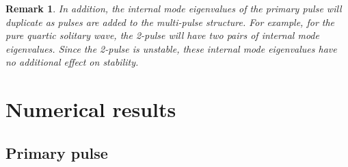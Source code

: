 \documentclass[12pt]{elsarticle}
\newtheorem{remark}{Remark}
\begin{document}
\begin{remark}In addition, the internal mode eigenvalues of the primary pulse will duplicate as pulses are added to the multi-pulse structure. For example, for the pure quartic solitary wave, the 2-pulse will have two pairs of internal mode eigenvalues. Since the 2-pulse is unstable, these internal mode eigenvalues have no additional effect on stability.
\end{remark}

\section{Numerical results}

\subsection{Primary pulse}
\end{document}
